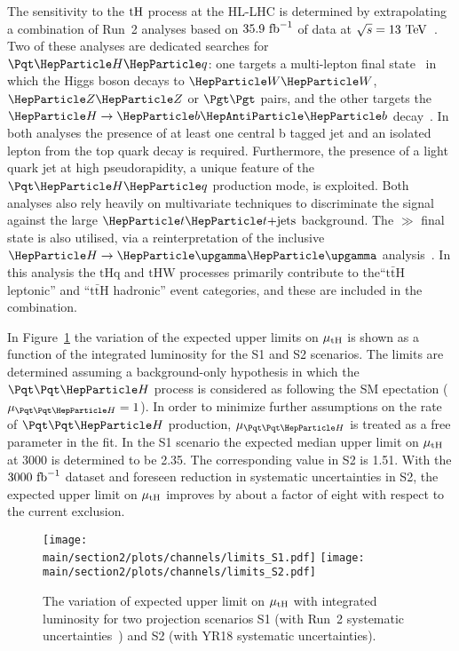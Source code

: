 The sensitivity to the $\text{tH}$ process at the HL-LHC is determined by extrapolating a combination of Run~2 analyses based on $35.9~\text{fb}^{-1}$ of data at $\sqrt{s}= 13 ~\text{TeV}$~\cite{CMS-PAS-HIG-18-009}. Two of these  analyses are dedicated searches for $\tHq$: one targets a multi-lepton final state~\cite{CMS-PAS-HIG-17-005} in which the Higgs boson decays to $\ww$, $\zz$ or $\tautau$ pairs, and the other targets the $\hbb$ decay~\cite{CMS_PAS_HIG_17-016}. In both analyses the presence of at least one central b tagged jet and an isolated lepton from the top quark decay is required. Furthermore, the presence of a light quark jet at high pseudorapidity, a unique feature of the $\tHq$ production mode, is exploited. Both analyses also rely heavily on multivariate techniques to discriminate the signal against the large $\ttjets$ background. The $\gg$ final state is also utilised, via a reinterpretation of the inclusive $\hgg$ analysis~\cite{Sirunyan:2018ouh}. In this analysis the $\mathrm{tHq}$ and $\mathrm{tHW}$ processes primarily contribute to the``$\mathrm{t\bar{t}H}$ leptonic'' and ``$\mathrm{t\bar{t}H}$ hadronic'' event categories, and these are included in the combination.


In Figure~\ref{fig:limit} the variation of the expected upper limits on $\mu_{\text{tH}}$ is shown as a function of the integrated luminosity for the S1 and S2 scenarios. The limits are determined assuming a background-only hypothesis in which the $\tth$ process is considered as following the SM epectation ($\mu_{\tth} = 1$). In order to minimize further assumptions on the rate of $\tth$ production, $\mu_{\tth}$ is treated as a free parameter in the fit.
In the S1 scenario the expected median upper limit on $\mu_{\text{tH}}$ at 3000 \Uifb is determined to be 2.35.
The corresponding value in S2 is 1.51. With the $3000 ~\text{fb}^{-1}$ dataset and foreseen reduction in systematic uncertainties in S2, the expected upper limit on $\mu_{\text{tH}}$ improves by about a factor of eight with respect to the current exclusion.

\begin{figure}[hbtp]
\begin{center}
\texttt{[image: \\main/section2/plots/channels/limits\_S1.pdf]} \hspace{1cm}
\texttt{[image: \\main/section2/plots/channels/limits\_S2.pdf]}
\end{center}
\caption{The variation of expected upper limit on $\mu_{\text{tH}}$ with integrated luminosity for two projection scenarios S1 (with Run~2 systematic uncertainties~\cite{CMS-PAS-HIG-18-009}) and S2 (with YR18 systematic uncertainties).}
\label{fig:limit}
\end{figure}

